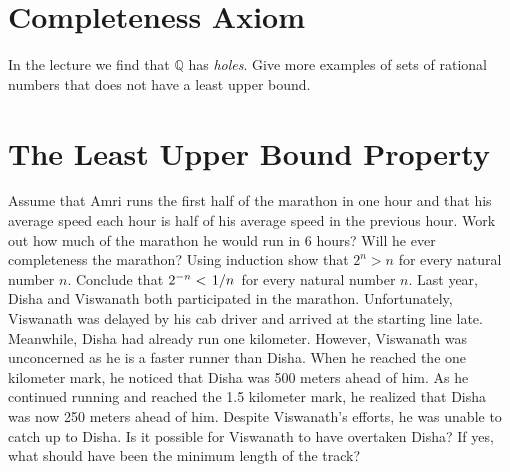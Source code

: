 \documentclass[12pt]{exam}
\begin{document}
\section{Completeness Axiom}
\begin{questions}
    \question In the lecture we find that $\mathbb{Q}$ has \textit{holes}. Give more examples of sets of rational numbers that does not have a least upper bound.
\end{questions}
\section{The Least Upper Bound Property}
\begin{questions}
    \question Assume that Amri runs the first half of the marathon in one hour and that his average speed each hour is half of his average speed in the previous hour. Work out how much of the marathon he would run in 6 hours? Will he ever completeness the marathon?  
    \question Using induction show that $2^n > n$ for every natural number $n$. Conclude that $2^{-n}<\flatfrac{1}{n}$ for every natural number $n$.
    \question Last year, Disha and Viswanath both participated in the marathon. Unfortunately, Viswanath was delayed by his cab driver and arrived at the starting line late. Meanwhile, Disha had already run one kilometer. However, Viswanath was unconcerned as he is a faster runner than Disha. When he reached the one kilometer mark, he noticed that Disha was 500 meters ahead of him. As he continued running and reached the 1.5 kilometer mark, he realized that Disha was now 250 meters ahead of him. Despite Viswanath's efforts, he was unable to catch up to Disha. Is it possible for Viswanath to have overtaken Disha? If yes, what should have been the minimum length of the track?
\end{questions}
\end{document}
